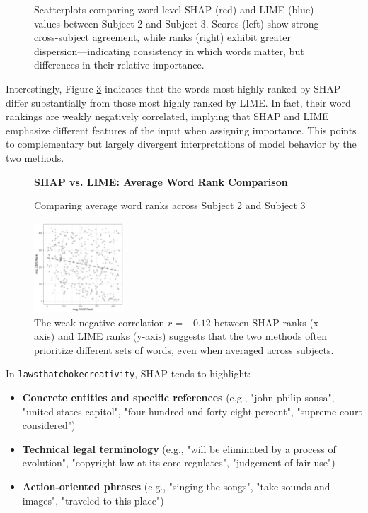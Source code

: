 \documentclass[10pt,letterpaper]{article}
\begin{document}
\begin{figure}[ht]
\begin{subfigure}[t]{0.22\textwidth}
        \label{subfig:scatter_laws_lime_rank}
    \end{subfigure}
    \caption{Scatterplots comparing word-level SHAP (red) and LIME (blue) values between Subject 2 and Subject 3. Scores (left) show strong cross-subject agreement, while ranks (right) exhibit greater dispersion—indicating consistency in which words matter, but differences in their relative importance.}
    \label{fig:scatter_laws_1}
\end{figure}


Interestingly, Figure \ref{fig:scatter_laws_2} indicates that the words most highly ranked by SHAP differ substantially from those most highly ranked by LIME. In fact, their word rankings are weakly negatively correlated, implying that SHAP and LIME emphasize different features of the input when assigning importance. This points to complementary but largely divergent interpretations of model behavior by the two methods.


\begin{figure}[ht]
    \centering

    \parbox{\textwidth}{\centering 
        \fontsize{13pt}{13pt}\selectfont \textbf{SHAP vs. LIME: Average Word Rank Comparison}  
        
        {\fontsize{11pt}{13pt}\selectfont Comparing average word ranks across Subject 2 and Subject 3} 
    }
  
    \includegraphics[width=0.3\textwidth]{figs/scatter_laws_rank.png}
    
    \caption{The weak negative correlation $r = -0.12$ between SHAP ranks (x-axis) and LIME ranks (y-axis) suggests that the two methods often prioritize different sets of words, even when averaged across subjects.}
    \label{fig:scatter_laws_2}
\end{figure}

\newpage


In \texttt{lawsthatchokecreativity}, SHAP tends to highlight:
\begin{itemize}
    \item \textbf{Concrete entities and specific references} (e.g., "john philip sousa", "united states capitol", "four hundred and forty eight percent", "supreme court considered")
    \item \textbf{Technical legal terminology} (e.g., "will be eliminated by a process of evolution", "copyright law at its core regulates", "judgement of fair use")
    \item \textbf{Action-oriented phrases} (e.g., "singing the songs", "take sounds and images", "traveled to this place")
\end{itemize}
\end{document}
